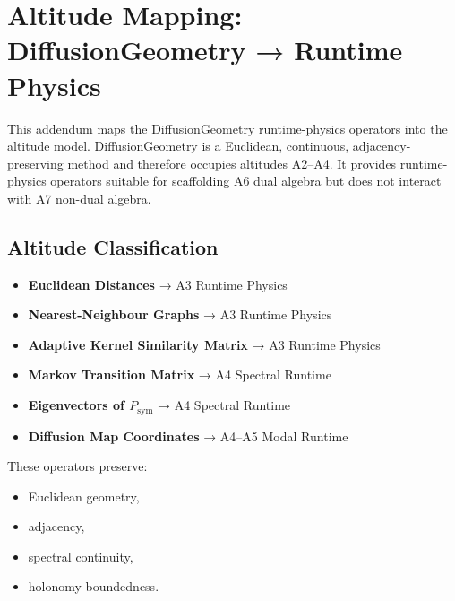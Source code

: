 
\section{Altitude Mapping: DiffusionGeometry → Runtime Physics}

This addendum maps the DiffusionGeometry runtime-physics operators into the
altitude model. DiffusionGeometry is a Euclidean, continuous, adjacency-
preserving method and therefore occupies altitudes A2–A4. It provides
runtime-physics operators suitable for scaffolding A6 dual algebra but does not
interact with A7 non-dual algebra.

\subsection{Altitude Classification}

\begin{itemize}
  \item \textbf{Euclidean Distances} → A3 Runtime Physics
  \item \textbf{Nearest-Neighbour Graphs} → A3 Runtime Physics
  \item \textbf{Adaptive Kernel Similarity Matrix} → A3 Runtime Physics
  \item \textbf{Markov Transition Matrix} → A4 Spectral Runtime
  \item \textbf{Eigenvectors of $P_{\mathrm{sym}}$} → A4 Spectral Runtime
  \item \textbf{Diffusion Map Coordinates} → A4–A5 Modal Runtime
\end{itemize}

These operators preserve:
\begin{itemize}
  \item Euclidean geometry,
  \item adjacency,
  \item spectral continuity,
  \item holonomy boundedness.
\end{itemize}

